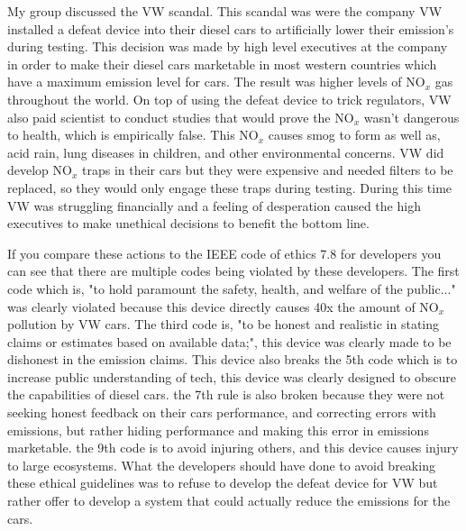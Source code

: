 \documentclass[11pt]{article}
\begin{document}
  My group discussed the VW scandal. This scandal was were the company VW installed a defeat device into their diesel cars to artificially lower their emission's during
  testing. This decision was made by high level executives at the company in order to make their diesel cars marketable in most western countries which have a maximum
  emission level for cars. The result was higher levels of NO$_x$ gas throughout the world. On top of using the defeat device to trick regulators, VW also paid
  scientist to conduct studies that would prove the NO$_x$ wasn't dangerous to health, which is empirically false. This NO$_x$ causes smog to form as well as, acid rain,
  lung diseases in children, and other environmental concerns. VW did develop NO$_x$ traps in their cars but they were expensive and needed filters to be replaced, so
  they would only engage these traps during testing. During this time VW was struggling financially and a feeling of desperation caused the high executives to make
  unethical decisions to benefit the bottom line.

  If you compare these actions to the IEEE code of ethics 7.8 for developers you can see that there are multiple codes
  being violated by these developers. The first code which is, "to hold paramount the safety, health, and welfare of the public..." was clearly violated because
  this device directly causes 40x the amount of NO$_x$ pollution by VW cars. The third code is, "to be honest and realistic in stating claims or estimates based on available data;",
  this device was clearly made to be dishonest in the emission claims. This device also breaks the 5th code which is to increase public understanding of tech, this device
  was clearly designed to obscure the capabilities of diesel cars. the 7th rule is also broken because they were not seeking honest feedback on their cars
  performance, and correcting errors with emissions, but rather hiding performance and making this error in emissions marketable. the 9th code is to avoid injuring
  others, and this device causes injury to large ecosystems. What the developers should have done to avoid breaking these ethical guidelines was to refuse to develop the defeat
  device for VW but rather offer to develop a system that could actually reduce the emissions for the cars.
\end{document}
